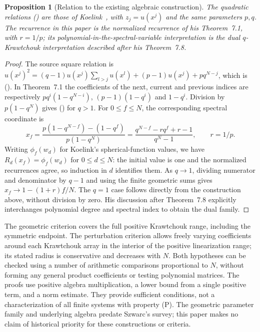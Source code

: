 \documentclass[twoside,10pt]{article}
\numberwithin{equation}{section}
\theoremstyle{slbody}
\newtheorem{proposition}[theorem]{Proposition}
\theoremstyle{definition}
\theoremstyle{remark}
\renewcommand{\eqref}[1]{\textup{{\normalfont(\oldstylenums{\ref{#1}}}\normalfont)}}
\begin{document}
\begin{proposition}[Relation to the existing algebraic construction]\label{prop:source}
The quadratic relations \eqref{eq:algebra} are those of Koelink~\cite[Theorem~3.1(ii), equation (3.3)]{koelink}, with $z_j=u(x^j)$ and the same parameters $p,q$. The recurrence in this paper is the normalized recurrence of his Theorem~7.1, with $r=1/p$; its polynomial-in-the-spectral-variable interpretation is the dual $q$-Krawtchouk interpretation described after his Theorem~7.8.
\end{proposition}
\begin{proof}
The source square relation is $u(x^j)^2=(q-1)u(x^j)\sum_{l>j}u(x^l)+(p-1)u(x^j)+pq^{N-j}$, which is \eqref{eq:algebra}. In Theorem~7.1 the coefficients of the next, current and previous indices are respectively $pq^i(1-q^{N-i})$, $(p-1)(1-q^i)$ and $1-q^i$. Division by $p(1-q^N)$ gives \eqref{eq:parameters} for $q>1$. For $0\leq f\leq N$, the corresponding spectral coordinate is
\[
x_f=\frac{p(1-q^{N-f})-(1-q^f)}{p(1-q^N)}
=\frac{q^{N-f}-rq^f+r-1}{q^N-1},\qquad r=1/p.
\]
Writing $\phi_f(w_d)$ for Koelink's spherical-function values, we have $R_d(x_f)=\phi_f(w_d)$ for $0\leq d\leq N$: the initial value is one and the normalized recurrences agree, so induction in $d$ identifies them.
As $q\to1$, dividing numerator and denominator by $q-1$ and using the finite geometric sums gives $x_f\to1-(1+r)f/N$.
The $q=1$ case follows directly from the construction above, without division by zero. His discussion after Theorem~7.8 explicitly interchanges polynomial degree and spectral index to obtain the dual family.
\end{proof}

The geometric criterion covers the full positive Krawtchouk range, including the symmetric endpoint. The perturbation criterion allows freely varying coefficients around each Krawtchouk array in the interior of the positive linearization range; its stated radius is conservative and decreases with $N$. Both hypotheses can be checked using a number of arithmetic comparisons proportional to $N$, without forming any general product coefficients or testing polynomial matrices. The proofs use positive algebra multiplication, a lower bound from a single positive term, and a norm estimate. They provide sufficient conditions, not a characterization of all finite systems with property (P). The geometric parameter family and underlying algebra predate Szwarc's survey; this paper makes no claim of historical priority for these constructions or criteria.
\end{document}
